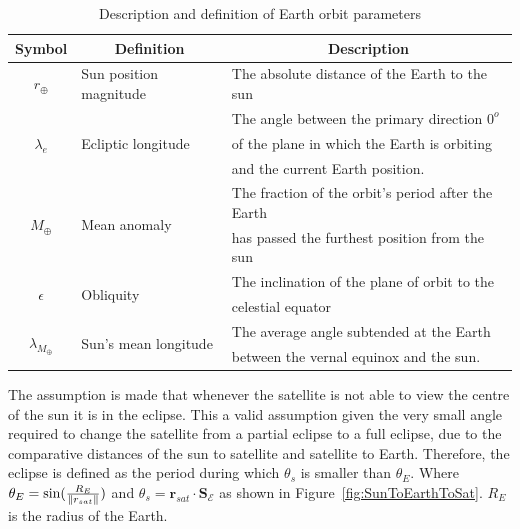 \begin{table}[]
\caption{Description and definition of Earth orbit parameters}
\begin{tabular}{@{}cll@{}}
	\toprule
	\multicolumn{1}{c}{\textbf{Symbol}} &
	\multicolumn{1}{c}{\textbf{Definition}} &
	\multicolumn{1}{c}{\textbf{Description}} \\ \midrule
	\multicolumn{1}{|c|}{$r_{\oplus}$} &
	\multicolumn{1}{l|}{Sun position magnitude} &
	\multicolumn{1}{l|}{The absolute distance of the Earth to the sun} \\ \midrule
	\multicolumn{1}{|c|}{\multirow{3}{*}{$\lambda_e$}} &
	\multicolumn{1}{l|}{\multirow{3}{*}{Ecliptic longitude}} &
	\multicolumn{1}{l|}{The angle between the primary direction $0^o$} \\
	\multicolumn{1}{|c|}{} &
	\multicolumn{1}{l|}{} &
	\multicolumn{1}{l|}{of the plane in which the Earth is orbiting} \\
	\multicolumn{1}{|c|}{} &
	\multicolumn{1}{l|}{} &
	\multicolumn{1}{l|}{and the current Earth position.} \\ \midrule
	\multicolumn{1}{|c|}{\multirow{2}{*}{$M_{\oplus}$}} &
	\multicolumn{1}{l|}{\multirow{2}{*}{Mean anomaly}} &
	\multicolumn{1}{l|}{The fraction of the orbit's period after the Earth} \\
	\multicolumn{1}{|c|}{} &
	\multicolumn{1}{l|}{} &
	\multicolumn{1}{l|}{has passed the furthest position from the sun} \\ \midrule
	\multicolumn{1}{|c|}{\multirow{2}{*}{$\epsilon$}} &
	\multicolumn{1}{l|}{\multirow{2}{*}{Obliquity}} &
	\multicolumn{1}{l|}{The inclination of the plane of orbit to the} \\
	\multicolumn{1}{|c|}{} &
	\multicolumn{1}{l|}{} &
	\multicolumn{1}{l|}{celestial equator} \\ \midrule
	\multicolumn{1}{|c|}{\multirow{2}{*}{$\lambda_{M_{\oplus}}$}} &
	\multicolumn{1}{l|}{\multirow{2}{*}{Sun's mean longitude}} &
	\multicolumn{1}{l|}{The average angle subtended at the Earth} \\
	\multicolumn{1}{|c|}{} &
	\multicolumn{1}{l|}{} &
	\multicolumn{1}{l|}{between the vernal equinox and the sun. \cite{ross1916sun}} \\ \bottomrule
\end{tabular}
\label{table:SunOrbitParameters}
\end{table}

The assumption is made that whenever the satellite is not able to view the centre of the sun it is in the eclipse. This a valid assumption given the very small angle required to change the satellite from a partial eclipse to a full eclipse, due to the comparative distances of the sun to satellite and satellite to Earth. Therefore, the eclipse is defined as the period during which $\theta_{s}$ is smaller than $\theta_E$. Where $\theta_E = \text{sin}(\frac{R_E}{\left\lVert r_{sat}\right\rVert})$ and $\theta_{s} = \mathbf{r}_{sat} \cdot \mathbf{S}_{\mathcal{E}}$ as shown in Figure~\ref{fig:SunToEarthToSat}. $R_E$ is the radius of the Earth.

